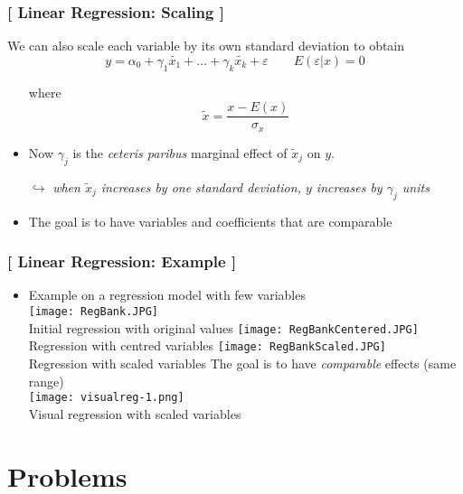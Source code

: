 \documentclass[xcolor=x11names,compress, aspectratio=169]{beamer}
\renewcommand{\(}{\begin{columns}}
\renewcommand{\)}{\end{columns}}
\newcommand{\<}[1]{\begin{column}{#1}}
\renewcommand{\>}{\end{column}}
\begin{document}
\begin{frame} %
\frametitle{\textcolor{brique}{[ Linear Regression: Scaling ]}}

We can also scale each variable by its own standard deviation to obtain
$$
y = \alpha_0 + \gamma_1 \tilde{x_1} + \ldots + \gamma_{k} \tilde{x_k}  + \varepsilon \qquad E (\varepsilon|x)  = 0
$$
\pause
\begin{itemize}[<+->]
  \item[] where $$\tilde{x} = \frac{x-E(x)}{\sigma_x} $$
  \item Now $\gamma_j$ is the \textit{ceteris paribus} marginal effect of $\tilde{x}_j$ on $y$.
   \item[$\hookrightarrow$] \textit{when  $\tilde{x}_j$ increases by one standard deviation,  $y$ increases by $\gamma_j$ units}
  \item The goal is to have variables and coefficients that are comparable
\end{itemize}
\end{frame}


\begin{frame} %
\frametitle{\textcolor{brique}{[ Linear Regression: Example ]}}
\pause
\begin{itemize}
\item Example on a regression model with few variables\\
   {\texttt{[image: RegBank.JPG]} \\ }
   {Initial regression with original values}
   { \texttt{[image: RegBankCentered.JPG]} \\ }
   {Regression with centred variables}
   {\texttt{[image: RegBankScaled.JPG]} \\ }
   {Regression with scaled variables}
   {The goal is to have \textit{comparable} effects (same range)\\ }
   {\texttt{[image: visualreg-1.png]} \\ }
   {Visual regression with scaled variables}
\end{itemize}
\end{frame}

\section{Problems}
\end{document}
